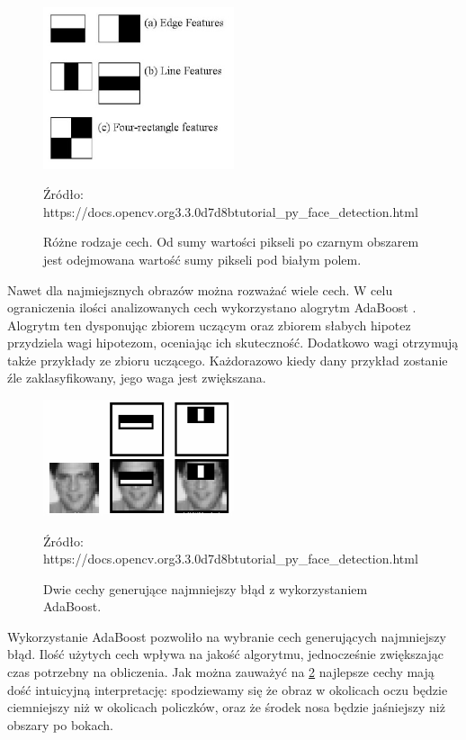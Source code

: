 \documentclass[oneside, eng]{mgr}
\begin{document}
\begin{figure}
\centering
	\includegraphics[width=0.50\textwidth,natwidth=610,natheight=642]{haar_features.jpg}\par\vspace{0.5cm}
\caption{Różne rodzaje cech. Od sumy wartości pikseli po czarnym obszarem jest odejmowana wartość sumy pikseli pod białym polem.}
Źródło: https://docs.opencv.org\/3.3.0\/d7\/d8b\/tutorial\_py\_face\_detection.html
	\label{fig:features}
\end{figure}

Nawet dla najmiejsznych obrazów można rozważać wiele cech. W celu ograniczenia ilości analizowanych cech wykorzystano alogrytm AdaBoost \cite{AdaBoost}. Alogrytm ten dysponując zbiorem uczącym oraz zbiorem słabych hipotez przydziela wagi hipotezom, oceniając ich skuteczność. Dodatkowo wagi otrzymują także przykłady ze zbioru uczącego. Każdorazowo kiedy dany przykład zostanie źle zaklasyfikowany, jego waga jest zwiększana. 


\begin{figure}
\centering
	\includegraphics[width=0.50\textwidth,natwidth=610,natheight=642]{haar.png}\par\vspace{1cm}
\caption{Dwie cechy generujące najmniejszy błąd z wykorzystaniem AdaBoost.}
Źródło: https://docs.opencv.org\/3.3.0\/d7\/d8b\/tutorial\_py\_face\_detection.html
	\label{fig:best_features}
\end{figure}

Wykorzystanie AdaBoost pozwoliło na wybranie cech generujących najmniejszy błąd. Ilość użytych cech wpływa na jakość algorytmu, jednocześnie zwiększając czas potrzebny na obliczenia. Jak można zauważyć na \ref{fig:best_features} najlepsze cechy mają dość intuicyjną interpretację: spodziewamy się że obraz w okolicach oczu będzie ciemniejszy niż w okolicach policzków, oraz że środek nosa będzie jaśniejszy niż obszary po bokach.
\end{document}
